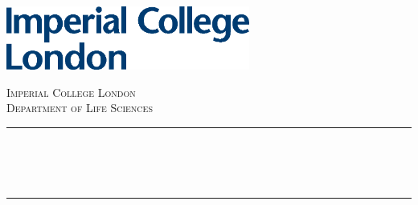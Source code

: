\begin{titlepage}

\newcommand{\HRule}{\rule{\linewidth}{0.5mm}} %


\includegraphics[width=8cm]{logo.eps}\\[1cm] %
 

\center %

\textsc{\Large Imperial College London}\\[0.5cm] %
\textsc{\large Department of Life Sciences}\\[0.5cm] %

\makeatletter
\HRule \\[0.4cm]
{ \huge \bfseries \@title}\\[0.4cm] %
{ \huge \bfseries \@author}\\[0.4cm]
\HRule \\[1.5cm]
 


\end{titlepage}
